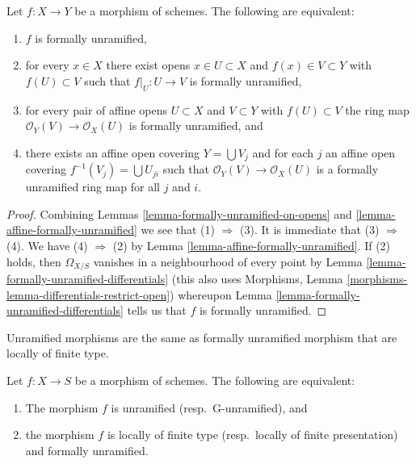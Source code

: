 \begin{lemma}
\label{lemma-formally-unramified}
Let $f : X \to Y$ be a morphism of schemes. The following are equivalent:
\begin{enumerate}
\item $f$ is formally unramified,
\item for every $x \in X$ there exist opens $x \in U \subset X$ and
$f(x) \in V \subset Y$ with $f(U) \subset V$ such that
$f|_U : U \to V$ is formally unramified,
\item for every pair of affine opens $U \subset X$ and $V \subset Y$
with $f(U) \subset V$ the ring map $\mathcal{O}_Y(V) \to \mathcal{O}_X(U)$
is formally unramified, and
\item there exists an affine open covering $Y = \bigcup V_j$ and
for each $j$ an affine open covering $f^{-1}(V_j) = \bigcup U_{ji}$
such that $\mathcal{O}_Y(V) \to \mathcal{O}_X(U)$ is a formally unramified
ring map for all $j$ and $i$.
\end{enumerate}
\end{lemma}

\begin{proof}
Combining Lemmas \ref{lemma-formally-unramified-on-opens} and
\ref{lemma-affine-formally-unramified} we see that (1) $\Rightarrow$ (3).
It is immediate that (3) $\Rightarrow$ (4).
We have (4) $\Rightarrow$ (2) by Lemma \ref{lemma-affine-formally-unramified}.
If (2) holds, then $\Omega_{X/S}$ vanishes in a neighbourhood
of every point by Lemma \ref{lemma-formally-unramified-differentials}
(this also uses Morphisms, Lemma
\ref{morphisms-lemma-differentials-restrict-open}) whereupon
Lemma \ref{lemma-formally-unramified-differentials} tells us that $f$
is formally unramified.
\end{proof}

\begin{lemma}
\label{lemma-unramified-formally-unramified}
\begin{slogan}
Unramified morphisms are the same as formally unramified morphism that
are locally of finite type.
\end{slogan}
Let $f : X \to S$ be a morphism of schemes.
The following are equivalent:
\begin{enumerate}
\item The morphism $f$ is unramified (resp.\ G-unramified), and
\item the morphism $f$ is locally of finite type (resp.\ locally of finite
presentation) and formally unramified.
\end{enumerate}
\end{lemma}


